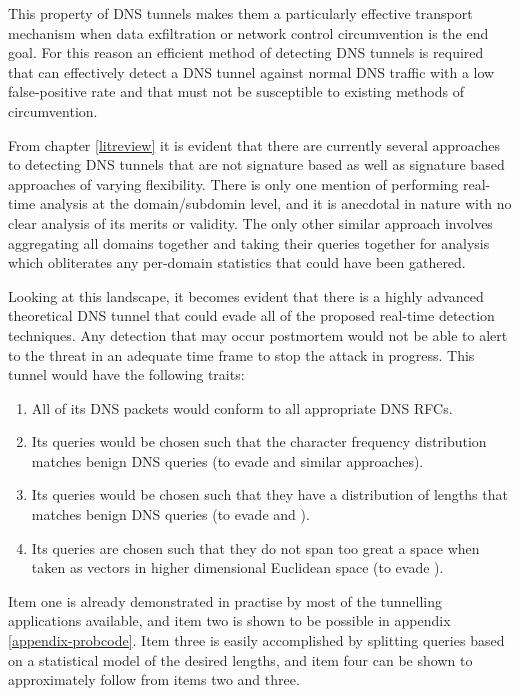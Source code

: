 \documentclass[12pt]{report}
\theoremstyle{remark}
\theoremstyle{definition}
\theoremstyle{definition}
\theoremstyle{definition}
\begin{document}
This property of DNS tunnels makes them a particularly effective transport
mechanism when data exfiltration or network control circumvention is the end
goal. For this reason an efficient method of detecting DNS tunnels is required
that can effectively detect a DNS tunnel against normal DNS traffic with a low
false-positive rate and that must not be susceptible to existing methods of
circumvention.

From chapter \ref{litreview} it is evident that there are currently several
approaches to detecting DNS tunnels that are not signature based as well as
signature based approaches of varying flexibility. There is only one mention of
performing real-time analysis at the domain/subdomin level, and it is anecdotal
in nature with no clear analysis of its merits or validity. The only other
similar approach involves aggregating all domains together and taking their
queries together for analysis which obliterates any per-domain statistics that
could have been gathered.

Looking at this landscape, it becomes evident that there is a highly advanced
theoretical DNS tunnel that could evade all of the proposed real-time detection
techniques. Any detection that may occur postmortem would not be able to alert
to the threat in an adequate time frame to stop the attack in progress. This
tunnel would have the following traits:

\label{supertunnel}
\begin{enumerate}
\item All of its DNS packets would conform
to all appropriate DNS RFCs.
\item Its queries would be chosen such that the
character frequency distribution matches benign DNS queries (to evade
\cite{Born2010.cfa} and similar approaches).
\item Its queries would be chosen
such that they have a distribution of lengths that matches benign DNS queries
(to evade \cite{Karasaridis2006} and \cite{SANS2013}).
\item Its queries are
chosen such that they do not span too great a space when taken as vectors in
higher dimensional Euclidean space (to evade \cite{jhind2009}). \end{enumerate}

Item one is already demonstrated in practise by most of the tunnelling
applications available, and item two is shown to be possible in appendix
\ref{appendix-probcode}. Item three is easily accomplished by splitting queries based
on a statistical model of the desired lengths, and item four can be shown to
approximately follow from items two and three.
\end{document}
